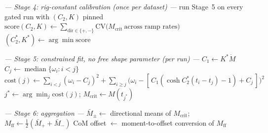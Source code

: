 \begin{algorithm}[t]
\begin{algorithmic}[1]
\Statex \textit{— Stage 4: rig-constant calibration (once per dataset) —}
  \State run Stage~5 on every gated run with $(C_2, K)$ pinned
  \State $\mathrm{score}(C_2,K) \gets \sum_{\mathrm{dir} \in \{+,-\}}
    \mathrm{CV}\bigl(M_{\mathrm{crit}}\ \text{across ramp rates}\bigr)$
\EndFor
\State $(C_2^\ast, K^\ast) \gets \arg\min \mathrm{score}$

\Statex \textit{— Stage 5: constrained fit, no free shape parameter
  (per run) —}
\State $C_1 \gets K^\ast \dot M$
  \State $C_j \gets \operatorname{median}\{\omega_i : i < j\}$
  \State $\mathrm{cost}(j) \gets \sum_{i<j} (\omega_i - C_j)^2
    + \sum_{i \ge j} \bigl(\omega_i - [\,C_1(\cosh C_2^\ast
    (t_i - t_j) - 1) + C_j\,]\bigr)^2$
\EndFor
\State $j^\ast \gets \arg\min_j \mathrm{cost}(j)$;\quad
  $M_{\mathrm{crit}} \gets M(t_{j^\ast})$

\Statex \textit{— Stage 6: aggregation —}
\State $\bar M_{\pm} \gets$ directional means of $M_{\mathrm{crit}}$;
  \quad $M_{\mathrm{ff}} \gets \tfrac12 (\bar M_{+} + \bar M_{-})$
\State CoM offset $\gets$ moment-to-offset conversion of
  $M_{\mathrm{ff}}$ 
\end{algorithmic}
\end{algorithm}
